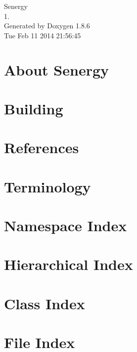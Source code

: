 \documentclass[twoside]{book}
\newcommand{\clearemptydoublepage}{%
  \newpage{\pagestyle{empty}\cleardoublepage}%
}
\begin{document}
\hypersetup{pageanchor=false}
\begin{titlepage}
\vspace*{7cm}
\begin{center}%
{\Large Senergy \\[1ex]\large 1. }\\
\vspace*{1cm}
{\large Generated by Doxygen 1.8.6}\\
\vspace*{0.5cm}
{\small Tue Feb 11 2014 21:56:45}\\
\end{center}
\end{titlepage}
\clearemptydoublepage
\tableofcontents
\clearemptydoublepage
{}
\hypersetup{pageanchor=true}

\chapter{About Senergy}
\label{index}\hypertarget{index}{}
\chapter{Building}
\label{building}
\hypertarget{building}{}

\chapter{References}
\label{references}
\hypertarget{references}{}

\chapter{Terminology}
\label{terminology}
\hypertarget{terminology}{}

\chapter{Namespace Index}

\chapter{Hierarchical Index}

\chapter{Class Index}

\chapter{File Index}

\end{document}
